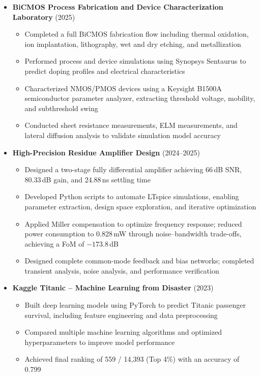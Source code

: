\documentclass[11pt]{article}
\begin{document}
\begin{itemize}
    \item \textbf{BiCMOS Process Fabrication and Device Characterization Laboratory} (2025)
    \begin{itemize}
        \item Completed a full BiCMOS fabrication flow including thermal oxidation, ion implantation, lithography, wet and dry etching, and metallization
        \item Performed process and device simulations using Synopsys Sentaurus to predict doping profiles and electrical characteristics
        \item Characterized NMOS/PMOS devices using a Keysight B1500A semiconductor parameter analyzer, extracting threshold voltage, mobility, and subthreshold swing
        \item Conducted sheet resistance measurements, ELM measurements, and lateral diffusion analysis to validate simulation model accuracy
    \end{itemize}

    \item \textbf{High-Precision Residue Amplifier Design} (2024--2025)
    \begin{itemize}
        \item Designed a two-stage fully differential amplifier achieving 66\,dB SNR, 80.33\,dB gain, and 24.88\,ns settling time
        \item Developed Python scripts to automate LTspice simulations, enabling parameter extraction, design space exploration, and iterative optimization
        \item Applied Miller compensation to optimize frequency response; reduced power consumption to 0.828\,mW through noise--bandwidth trade-offs, achieving a FoM of $-173.8$\,dB
        \item Designed complete common-mode feedback and bias networks; completed transient analysis, noise analysis, and performance verification
    \end{itemize}

    \item \textbf{Kaggle Titanic -- Machine Learning from Disaster} (2023)
    \begin{itemize}
        \item Built deep learning models using PyTorch to predict Titanic passenger survival, including feature engineering and data preprocessing
        \item Compared multiple machine learning algorithms and optimized hyperparameters to improve model performance
        \item Achieved final ranking of 559 / 14{,}393 (Top 4\%) with an accuracy of 0.799
    \end{itemize}
\end{itemize}
\end{document}
